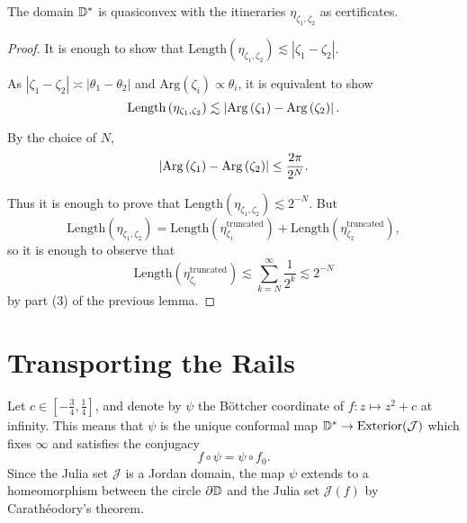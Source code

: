 \begin{theorem} \label{quasiconvex disk}
The domain $\mathbb{D}^{*}$ is quasiconvex with the itineraries $\eta_{\zeta_1,\zeta_2}$ as certificates.
\end{theorem}

\begin{proof}
It is enough to show that $\mathrm{Length}\left(\eta_{\zeta_{1},\zeta_{2}}\right)\lesssim\left|\zeta_{1}-\zeta_{2}\right|$.

As $\left|\zeta_{1}-\zeta_{2}\right|\asymp\left|\theta_{1}-\theta_{2}\right|$
and $\mathrm{Arg}\left(\zeta_{i}\right)\propto\theta_{i}$, it is equivalent to show
\[
\mathrm{Length}\left(\eta_{\zeta_{1},\zeta_{2}}\right)\lesssim\left|\mathrm{Arg}\left(\zeta_{1}\right)-\mathrm{Arg}\left(\zeta_{2}\right)\right|.
\]

By the choice of $N$, 
\[
\left|\mathrm{Arg}\left(\zeta_{1}\right)-\mathrm{Arg}\left(\zeta_{2}\right)\right|\leq\frac{2\pi}{2^{N}}.
\]

Thus it is enough to prove that $\mathrm{Length}\left(\eta_{\zeta_{1},\zeta_{2}}\right)\lesssim2^{-N}$.
But 
\[
\mathrm{Length}\left(\eta_{\zeta_{1},\zeta_{2}}\right)=\mathrm{Length}\left(\eta_{\zeta_{1}}^{\text{truncated}}\right)+\mathrm{Length}\left(\eta_{\zeta_{2}}^{\text{truncated}}\right),
\]
so it is enough to observe that 
\[
\mathrm{Length}\left(\eta_{\zeta_{i}}^{\text{truncated}}\right)\lesssim\sum_{k=N}^{\infty}\frac{1}{2^{k}}\lesssim2^{-N}
\]
by part (3) of the previous lemma.

\end{proof}









\section{Transporting the Rails} \label{rails-section}
Let $c\in\left[-\frac 34,\frac{1}{4}\right]$, and denote by $\psi$ the Böttcher coordinate of $f: z\mapsto z^2+c$ at infinity. 
This means that $\psi$ is the unique conformal map $\mathbb{D}^{*}\to\mathrm{Exterior}(\mathcal{J})$  which fixes $\infty$ and satisfies the conjugacy $$f\circ\psi=\psi\circ f_{0}.$$
Since the Julia set $\mathcal J$ is a Jordan domain, the map $\psi$ extends to a homeomorphism between the circle
$\partial\mathbb{D}$ and the Julia set $\mathcal{J}(f)$ by Carathéodory's
theorem.

